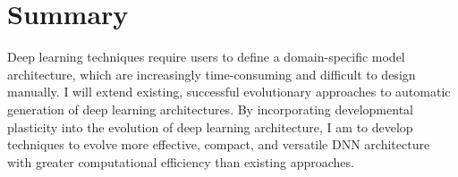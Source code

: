 \section{Summary}

Deep learning techniques require users to define a domain-specific model architecture, which are increasingly time-consuming and difficult to design manually.
I will extend existing, successful evolutionary approaches to automatic generation of deep learning architectures.
By incorporating developmental plasticity into the evolution of deep learning architecture, I am to develop techniques to evolve more effective, compact, and versatile DNN architecture with greater computational efficiency than existing approaches.
